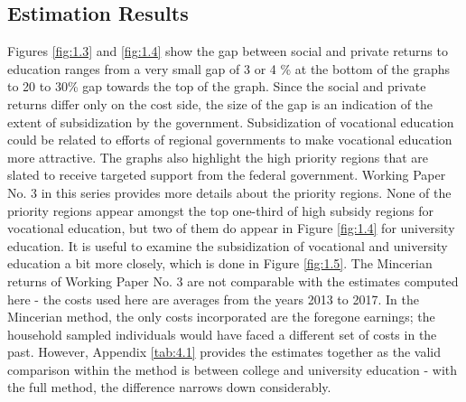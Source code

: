 \documentclass[alpha-refs]{wiley-article-05g}
\begin{document}
\vspace{-2em}

\subsection{Estimation Results} 

Figures \ref{fig:1.3} and \ref{fig:1.4} show the gap between social and private returns to education ranges from a very small gap of 3 or 4 \% at the bottom of the graphs to 20 to 30\% gap towards the top of the graph. Since the social and private returns differ only on the cost side, the size of the gap is an indication of the extent of subsidization by the government. Subsidization of vocational education could be related to efforts of regional governments to make vocational education more attractive. The graphs also highlight the high priority regions that are slated to receive targeted support from the federal government. Working Paper No. 3 in this series provides more details about the priority regions. None of the priority regions appear amongst the top one-third of high subsidy regions for vocational education, but two of them do appear in Figure \ref{fig:1.4} for university education. It is useful to examine the subsidization of vocational and university education a bit more closely, which is done in Figure \ref{fig:1.5}. The Mincerian returns of Working Paper No. 3 are not comparable with the estimates computed here - the costs used here are averages from the years 2013 to 2017. In the Mincerian method, the only costs incorporated are the foregone earnings; the household sampled individuals would have faced a different set of costs in the past. However, Appendix \ref{tab:4.1} provides the estimates together as the valid comparison within the method is between college and university education - with the full method, the difference narrows down considerably. 
\end{document}
